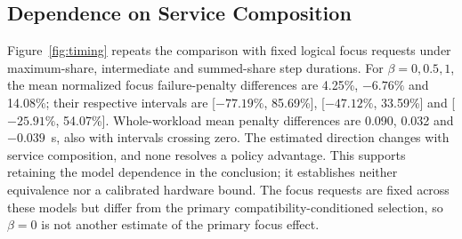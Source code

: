 \subsection{Dependence on Service Composition}
\label{sec:timing-results}


Figure~\ref{fig:timing} repeats the comparison with fixed logical focus
requests under maximum-share, intermediate and summed-share step durations.
For $\beta=0,0.5,1$, the mean normalized focus failure-penalty differences
are 4.25\%, $-6.76\%$ and 14.08\%; their respective intervals are
[$-77.19\%$, 85.69\%], [$-47.12\%$, 33.59\%] and
[$-25.91\%$, 54.07\%]. Whole-workload mean penalty differences are 0.090,
0.032 and $-0.039$~s, also with intervals crossing zero. The estimated
direction changes with service composition, and none resolves a policy
advantage. This supports retaining the model dependence in the conclusion;
it establishes neither equivalence nor a calibrated hardware bound.
The focus requests are fixed across these models but differ from the primary
compatibility-conditioned selection, so $\beta=0$ is not another estimate
of the primary focus effect.

